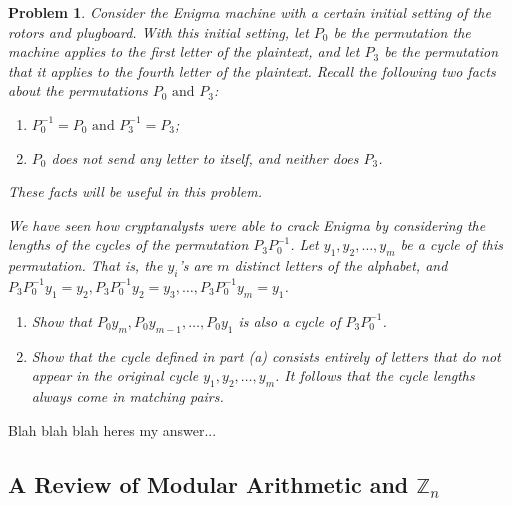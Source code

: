 \documentclass[12pt]{article}
\newenvironment{answer}
    {\begin{adjustwidth}{0pt}{0pt}}
    {\end{adjustwidth}}
\newtheorem{problem}{Problem}
\theoremstyle{remark}  %
\begin{document}
\vspace{5pt}
    \begin{problem}
        Consider the Enigma machine with a certain initial setting of the rotors and plugboard. With this initial setting, let $P_0$ be the permutation the machine applies to the first letter of the plaintext, and let $P_3$ be the permutation that it applies to the fourth letter of the plaintext. Recall the following two facts about the permutations $P_0\text{ and }P_3$:
        \begin{enumerate}[label=(\roman*)]
            \item $P_0^{-1}=P_0 \text{ and }P_3^{-1}=P_3$;
            \item $P_0$ does not send any letter to itself, and neither does $P_3$.
        \end{enumerate}
        These facts will be useful in this problem. \par We have seen how cryptanalysts were able to crack Enigma by considering the lengths of the cycles of the permutation $P_3P_0^{-1}$. Let $y_1,y_2,\dots,y_m$ be a cycle of this permutation. That is, the $y_i$'s are $m$ distinct letters of the alphabet, and $P_3P_0^{-1}y_1=y_2,P_3P_0^{-1}y_2=y_3,\dots,P_3P_0^{-1}y_m=y_1$.
        \begin{enumerate}
            \item Show that $P_0y_m,P_0y_{m-1},\dots,P_0y_1$ is also a cycle of $P_3P_0^{-1}$.
            \item Show that the cycle defined in part (a) consists entirely of letters that do not appear in the original cycle $y_1,y_2,\dots,y_m$. It follows that the cycle lengths always come in matching pairs.
        \end{enumerate}
    \end{problem}
    \begin{answer}
        Blah blah blah heres my answer...
    \end{answer}

\subsection{A Review of Modular Arithmetic and $\mathbb{Z}_n$}
\end{document}
